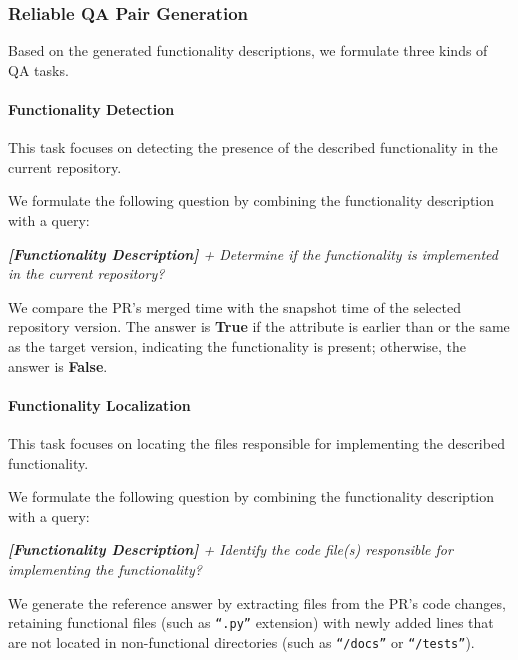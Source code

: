 \subsubsection{Reliable QA Pair Generation}
Based on the generated functionality descriptions, we formulate three kinds of QA tasks.

\paragraph{\textbf{Functionality Detection}}
This task focuses on detecting the presence of the described functionality in the current repository.
\begin{description}[leftmargin=0pt, labelwidth=2em]
    \item[\textbf{$\blacktriangleleft$} \textbf{\textcolor{violet}{Question}}:] We formulate the following question by combining the functionality description with a query:
\begin{myfindbox}
    \small \textit{\textbf{[Functionality Description]} + Determine if the functionality is implemented in the current repository?}
\end{myfindbox}
    \item [\textbf{$\blacktriangleright$} \textbf{\textcolor{orange}{Answer}}:] We compare the PR's merged time with the snapshot time of the selected repository version. The answer is \textbf{True} if the attribute is earlier than or the same as the target version, indicating the functionality is present; otherwise, the answer is \textbf{False}.
\end{description}

\paragraph{\textbf{Functionality Localization}}
This task focuses on locating the files responsible for implementing the described functionality.
\begin{description}[leftmargin=0pt, labelwidth=2em]
    \item[\textbf{$\blacktriangleleft$} \textbf{\textcolor{violet}{Question}}:] We formulate the following question by combining the functionality description with a query:
\begin{myfindbox}
    \small \textit{\textbf{[Functionality Description]} + Identify the code file(s) responsible for implementing the functionality?}
\end{myfindbox}
    \item [\textbf{$\blacktriangleright$} \textbf{\textcolor{orange}{Answer}}:] We generate the reference answer by extracting files from the PR's code changes, retaining functional files (such as \texttt{``.py''} extension) with newly added lines that are not located in non-functional directories (such as \texttt{``/docs''} or \texttt{``/tests''}).
\end{description}

